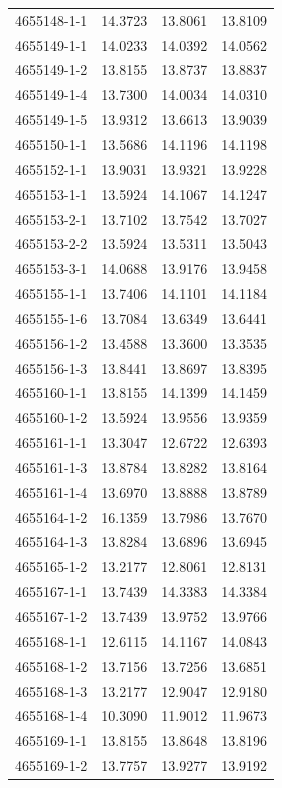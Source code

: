 \begin{longtable}{lrrr}
4655148-1-1 & 14.3723 & 13.8061 & 13.8109 \\
4655149-1-1 & 14.0233 & 14.0392 & 14.0562 \\
4655149-1-2 & 13.8155 & 13.8737 & 13.8837 \\
4655149-1-4 & 13.7300 & 14.0034 & 14.0310 \\
4655149-1-5 & 13.9312 & 13.6613 & 13.9039 \\
4655150-1-1 & 13.5686 & 14.1196 & 14.1198 \\
4655152-1-1 & 13.9031 & 13.9321 & 13.9228 \\
4655153-1-1 & 13.5924 & 14.1067 & 14.1247 \\
4655153-2-1 & 13.7102 & 13.7542 & 13.7027 \\
4655153-2-2 & 13.5924 & 13.5311 & 13.5043 \\
4655153-3-1 & 14.0688 & 13.9176 & 13.9458 \\
4655155-1-1 & 13.7406 & 14.1101 & 14.1184 \\
4655155-1-6 & 13.7084 & 13.6349 & 13.6441 \\
4655156-1-2 & 13.4588 & 13.3600 & 13.3535 \\
4655156-1-3 & 13.8441 & 13.8697 & 13.8395 \\
4655160-1-1 & 13.8155 & 14.1399 & 14.1459 \\
4655160-1-2 & 13.5924 & 13.9556 & 13.9359 \\
4655161-1-1 & 13.3047 & 12.6722 & 12.6393 \\
4655161-1-3 & 13.8784 & 13.8282 & 13.8164 \\
4655161-1-4 & 13.6970 & 13.8888 & 13.8789 \\
4655164-1-2 & 16.1359 & 13.7986 & 13.7670 \\
4655164-1-3 & 13.8284 & 13.6896 & 13.6945 \\
4655165-1-2 & 13.2177 & 12.8061 & 12.8131 \\
4655167-1-1 & 13.7439 & 14.3383 & 14.3384 \\
4655167-1-2 & 13.7439 & 13.9752 & 13.9766 \\
4655168-1-1 & 12.6115 & 14.1167 & 14.0843 \\
4655168-1-2 & 13.7156 & 13.7256 & 13.6851 \\
4655168-1-3 & 13.2177 & 12.9047 & 12.9180 \\
4655168-1-4 & 10.3090 & 11.9012 & 11.9673 \\
4655169-1-1 & 13.8155 & 13.8648 & 13.8196 \\
4655169-1-2 & 13.7757 & 13.9277 & 13.9192 \\

\end{longtable}

